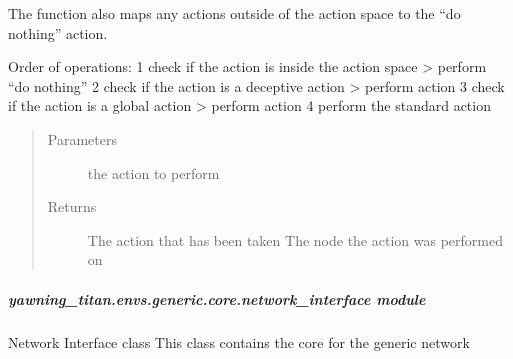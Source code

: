 \documentclass[letterpaper,10pt,english]{sphinxmanual}
\begin{document}
\begin{fulllineitems}
\begin{fulllineitems}
\sphinxAtStartPar
The function also maps any actions outside of the action space to the “do nothing” action.

\sphinxAtStartPar
Order of operations:
1\sphinxhyphen{} check if the action is inside the action space \textendash{}\textgreater{} perform “do nothing”
2\sphinxhyphen{} check if the action is a deceptive action \textendash{}\textgreater{} perform action
3\sphinxhyphen{} check if the action is a global action \textendash{}\textgreater{} perform action
4\sphinxhyphen{} perform the standard action
\begin{quote}\begin{description}
\item[{Parameters}] \leavevmode
\sphinxAtStartPar
{} \textendash{} the action to perform

\item[{Returns}] \leavevmode
\sphinxAtStartPar
The action that has been taken
The node the action was performed on

\end{description}\end{quote}

\end{fulllineitems}


\end{fulllineitems}



\subparagraph{yawning\_titan.envs.generic.core.network\_interface module}
\label{\detokenize{source/yawning_titan.envs.generic.core:module-yawning_titan.envs.generic.core.network_interface}}\label{\detokenize{source/yawning_titan.envs.generic.core:yawning-titan-envs-generic-core-network-interface-module}}
\sphinxAtStartPar
Network Interface class
This class contains the core for the generic network
\end{document}

